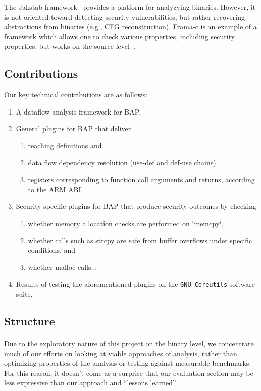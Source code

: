 \documentclass[letterpaper,11pt]{article}
\begin{document}
The Jakstab framework~\cite{kinder2008jakstab} provides a platform for
analyzying binaries. However, it is not oriented toward detecting security
vulnerabilities, but rather recovering abstractions from binaries (e.g.,
CFG reconstruction). Frama-c is an example of a framework which
allows one to check various properties, including security properties,
but works on the source level~\cite{cuoq2012frama}.

\subsection{Contributions}

Our key technical contributions are as follows:

\begin{enumerate}
  \item A dataflow analysis framework for BAP.
  \item General plugins for BAP that deliver
    \begin{enumerate}
      \item reaching definitions and
      \item data flow dependency resolution (use-def and def-use chains).
      \item registers corresponding to function call arguments and returns,
            according to the ARM ABI.
    \end{enumerate}
  \item Security-specific plugins for BAP that produce security outcomes by checking
    \begin{enumerate}
      \item whether memory allocation checks are performed on `memcpy`,
      \item whether calls such as strcpy are safe from buffer overflows under
        specific conditions, and
      \item whether malloc calls... %
    \end{enumerate}
  \item Results of testing the aforementioned plugins on the \texttt{GNU Coreutils}
    software suite.
\end{enumerate}

\subsection{Structure}

\paragraph{}
Due to the exploratory nature of this project on the binary level, we
concentrate much of our efforts on looking at viable approaches of analysis,
rather than optimizing properties of the analysis or testing against measurable
benchmarks. For this reason, it doesn't come as a surprise that our evaluation
section may be less expressive than our approach and ``lessons learned''.
\end{document}
